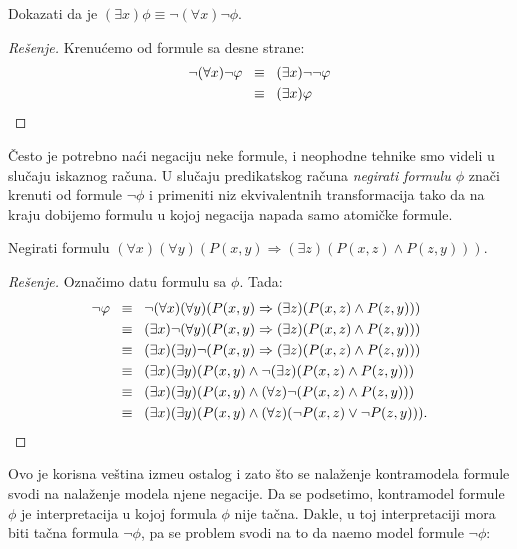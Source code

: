\begin{EX}
  Dokazati da je $(\exists x)\phi \equiv \lnot (\forall x) \lnot \phi$.
\end{EX}
\begin{proof}[Re\v senje]
  Krenu\'cemo od formule sa desne strane:
  \begin{align*}
    \lnot (\forall x) \lnot \phi
    &\;\;\equiv\;\; (\exists x) \lnot \lnot \phi\\
    &\;\;\equiv\;\; (\exists x) \phi\qedhere
  \end{align*}
\end{proof}

\v Cesto je potrebno na\'ci negaciju neke formule, i neophodne tehnike smo videli u slu\v caju
iskaznog ra\v cuna. U slu\v caju predikatskog ra\v cuna
\emph{negirati formulu $\phi$} zna\v ci krenuti od formule $\lnot \phi$ i primeniti niz ekvivalentnih
transformacija tako da na kraju dobijemo formulu u kojoj negacija napada samo atomi\v cke formule.

\begin{EX}\label{ft04.ex.density}
  Negirati formulu $(\forall x)(\forall y)(P(x, y) \Rightarrow (\exists z)(P(x, z) \land P(z, y)))$.
\end{EX}
\begin{proof}[Re\v senje]
  Ozna\v cimo datu formulu sa $\phi$. Tada:
  \begin{align*}
    \lnot \phi
    &\;\;\equiv\;\; \lnot(\forall x)(\forall y)(P(x, y) \Rightarrow (\exists z)(P(x, z) \land P(z, y)))\\
    &\;\;\equiv\;\; (\exists x)\lnot(\forall y)(P(x, y) \Rightarrow (\exists z)(P(x, z) \land P(z, y)))\\
    &\;\;\equiv\;\; (\exists x)(\exists y)\lnot(P(x, y) \Rightarrow (\exists z)(P(x, z) \land P(z, y)))\\
    &\;\;\equiv\;\; (\exists x)(\exists y)(P(x, y) \land \lnot(\exists z)(P(x, z) \land P(z, y)))\\
    &\;\;\equiv\;\; (\exists x)(\exists y)(P(x, y) \land (\forall z)\lnot(P(x, z) \land P(z, y)))\\
    &\;\;\equiv\;\; (\exists x)(\exists y)(P(x, y) \land (\forall z)(\lnot P(x, z) \lor \lnot P(z, y))).\qedhere
  \end{align*}
\end{proof}

Ovo je korisna ve\v stina izme\dj u ostalog i zato \v sto se nala\v zenje kontramodela formule
svodi na nala\v zenje modela njene negacije. Da se podsetimo,
kontramodel formule $\phi$ je interpretacija u kojoj formula $\phi$ nije ta\v cna.
Dakle, u toj interpretaciji mora biti ta\v cna formula $\lnot\phi$, pa se problem svodi na to da na\dj emo
model formule $\lnot\phi$:

